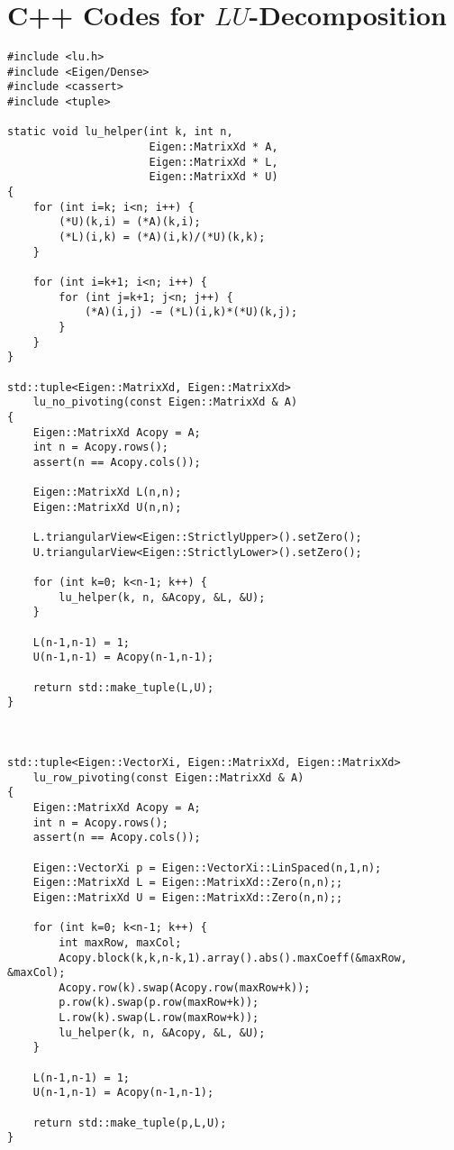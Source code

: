 \documentclass[paper=a4, fontsize=11pt]{scrartcl} %
\numberwithin{equation}{section} %
\numberwithin{figure}{section} %
\numberwithin{table}{section} %
\begin{document}
\section{C++ Codes for $LU$-Decomposition}
\begin{lstlisting}
#include <lu.h>
#include <Eigen/Dense>
#include <cassert>
#include <tuple>

static void lu_helper(int k, int n,
                      Eigen::MatrixXd * A,
                      Eigen::MatrixXd * L,
                      Eigen::MatrixXd * U)
{
    for (int i=k; i<n; i++) {
        (*U)(k,i) = (*A)(k,i);
        (*L)(i,k) = (*A)(i,k)/(*U)(k,k);
    }

    for (int i=k+1; i<n; i++) {
        for (int j=k+1; j<n; j++) {
            (*A)(i,j) -= (*L)(i,k)*(*U)(k,j);
        }
    }
}

std::tuple<Eigen::MatrixXd, Eigen::MatrixXd>
    lu_no_pivoting(const Eigen::MatrixXd & A)
{
    Eigen::MatrixXd Acopy = A;
    int n = Acopy.rows();
    assert(n == Acopy.cols());

    Eigen::MatrixXd L(n,n);
    Eigen::MatrixXd U(n,n);

    L.triangularView<Eigen::StrictlyUpper>().setZero();
    U.triangularView<Eigen::StrictlyLower>().setZero();

    for (int k=0; k<n-1; k++) {
        lu_helper(k, n, &Acopy, &L, &U);
    }

    L(n-1,n-1) = 1;
    U(n-1,n-1) = Acopy(n-1,n-1);

    return std::make_tuple(L,U);
}



std::tuple<Eigen::VectorXi, Eigen::MatrixXd, Eigen::MatrixXd>
    lu_row_pivoting(const Eigen::MatrixXd & A)
{
    Eigen::MatrixXd Acopy = A;
    int n = Acopy.rows();
    assert(n == Acopy.cols());

    Eigen::VectorXi p = Eigen::VectorXi::LinSpaced(n,1,n);
    Eigen::MatrixXd L = Eigen::MatrixXd::Zero(n,n);;
    Eigen::MatrixXd U = Eigen::MatrixXd::Zero(n,n);;

    for (int k=0; k<n-1; k++) {
        int maxRow, maxCol;
        Acopy.block(k,k,n-k,1).array().abs().maxCoeff(&maxRow, &maxCol);
        Acopy.row(k).swap(Acopy.row(maxRow+k));
        p.row(k).swap(p.row(maxRow+k));
        L.row(k).swap(L.row(maxRow+k));
        lu_helper(k, n, &Acopy, &L, &U);
    }

    L(n-1,n-1) = 1;
    U(n-1,n-1) = Acopy(n-1,n-1);

    return std::make_tuple(p,L,U);
}
\end{lstlisting}
\end{document}
